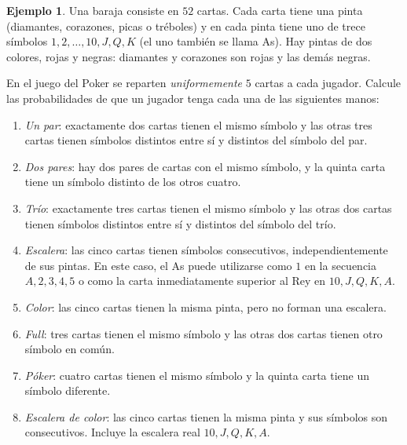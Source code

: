 \documentclass[12pt]{amsart}
\theoremstyle{definition}
\newtheorem{examplex}[lemma]{Ejemplo}
\begin{document}
\begin{examplex}
Una baraja consiste en $52$ cartas. Cada carta tiene una pinta (diamantes, corazones, picas o tréboles) y en cada pinta tiene uno de trece símbolos
$1,2,\dots,10,J,Q,K$ (el uno también se llama As). Hay pintas de dos colores, rojas y negras: diamantes y corazones son rojas y las demás negras.

En el juego del Poker se reparten \emph{uniformemente} $5$ cartas a cada jugador. Calcule las probabilidades de que un jugador tenga cada una de las siguientes manos:

\begin{enumerate}
    \item \emph{Un par}: exactamente dos cartas tienen el mismo símbolo y las otras tres cartas tienen símbolos distintos entre sí y distintos del símbolo del par.

    \item \emph{Dos pares}: hay dos pares de cartas con el mismo símbolo, y la quinta carta tiene un símbolo distinto de los otros cuatro.

    \item \emph{Trío}: exactamente tres cartas tienen el mismo símbolo y las otras dos cartas tienen símbolos distintos entre sí y distintos del símbolo del trío.

    \item \emph{Escalera}: las cinco cartas tienen símbolos consecutivos, independientemente de sus pintas. En este caso, el As puede utilizarse como $1$ en la secuencia
    $A,2,3,4,5$ o como la carta inmediatamente superior al Rey en
    $10,J,Q,K,A$.

    \item \emph{Color}: las cinco cartas tienen la misma pinta, pero no forman una escalera.

    \item \emph{Full}: tres cartas tienen el mismo símbolo y las otras dos cartas tienen otro símbolo en común.

    \item \emph{Póker}: cuatro cartas tienen el mismo símbolo y la quinta carta tiene un símbolo diferente.

    \item \emph{Escalera de color}: las cinco cartas tienen la misma pinta y sus símbolos son consecutivos. Incluye la escalera real
    $10,J,Q,K,A$.
\end{enumerate}
\end{examplex}
\end{document}
